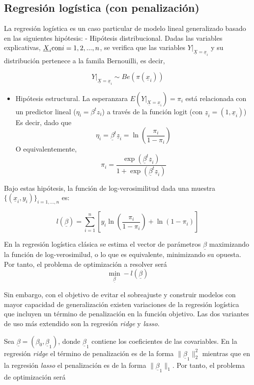 \documentclass[12pt,a4paper,]{book}
\providecommand{\tightlist}{%
  \setlength{\itemsep}{0pt}\setlength{\parskip}{0pt}}
\numberwithin{dummy}{section}
\theoremstyle{ocrenumbox}
\theoremstyle{blacknumex}
\theoremstyle{blacknumbox}
\theoremstyle{ocrenum}
\theoremstyle{ocrenum}
\begin{document}
\hypertarget{regresiuxf3n-loguxedstica-con-penalizaciuxf3n}{%
\subsection{Regresión logística (con
penalización)}\label{regresiuxf3n-loguxedstica-con-penalizaciuxf3n}}

La regresión logística es un caso particular de modelo lineal
generalizado basado en las siguientes hipótesis: - Hipótesis
distribucional. Dadas las variables explicativas,
\(\underline X_i \space \space \text{con} \space \space i = 1,2,...,n\),
se verifica que las variables \(Y|_{\underline X= \underline x_i}\) y su
distribución pertenece a la famila Bernouilli, es decir,

\[Y|_{\underline X= \underline x_i} \sim Be(\pi( \underline x_i))\]

\begin{itemize}
\tightlist
\item
  Hipótesis estructural. La esperanzara
  \(E(Y|_{\underline X= \underline x_i}) = \pi_i\) está relacionada con
  un predictor lineal (\(\eta_i = \beta^t z_i\)) a través de la función
  logit (con \(\underline z_i = \left(1,\underline x_i\right)\)) Es
  decir, dado que
  \[\eta_i = \underline \beta^t \underline z_i= \ln(\frac{\pi_i}{1-\pi_i})\]
  O equivalentemente,
  \[\pi_i = \frac{\exp(\underline \beta^t \underline z_i)}{1 + \exp(\underline \beta^t \underline z_i)}\]
\end{itemize}

Bajo estas hipótesis, la función de log-verosimilitud dada una muestra
\(\{ (\underline x_i,y_i) \}_{i=1,...,n}\) es:

\[ l(\underline \beta) = 
\sum_{i=1}^n \left[ 
y_i\ln \left( \frac{\pi_i}{1-\pi_i} \right) + 
\ln \left( 1 - \pi_i\right) \right]\]

En la regresión logística clásica se estima el vector de parámetros
\(\underline \beta\) maximizando la función de log-verosimilud, o lo que
es equivalente, minimizando su opuesta. Por tanto, el problema de
optimización a resolver será
\[\min_{\underline \beta} -l(\underline \beta)\]

Sin embargo, con el objetivo de evitar el sobreajuste y construir
modelos con mayor capacidad de generalización existen variaciones de la
regresión logística que incluyen un término de penalización en la
función objetivo. Las dos variantes de uso más extendido son la
regresión \emph{ridge} y \emph{lasso}.

Sea \(\underline \beta = \left( \beta_0, \underline \beta_1 \right)\),
donde \(\underline \beta_1\) contiene los coeficientes de las
covariables. En la regresión \emph{ridge} el término de penalización es
de la forma \(\| \underline \beta_1 \|^2_2\) mientras que en la
regresión \emph{lasso} el penalización es de la forma
\(\| \underline \beta_1 \|_1\). Por tanto, el problema de optimización
será
\end{document}
